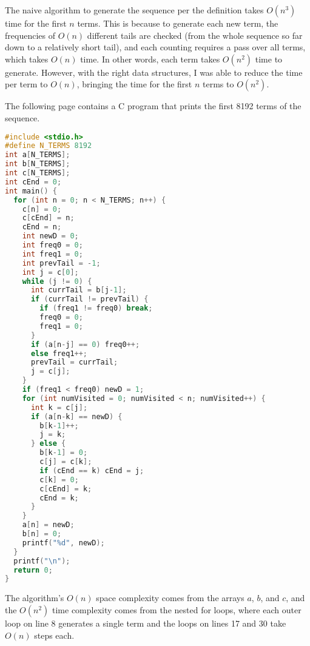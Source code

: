 \documentclass{article}
\begin{document}
The naive algorithm to generate the sequence per the definition
takes $O(n^3)$ time for the first $n$ terms.
This is because to generate each new term,
the frequencies of $O(n)$ different tails are checked
(from the whole sequence so far down to a relatively short tail),
and each counting requires a pass over all terms,
which takes $O(n)$ time.
In other words, each term takes $O(n^2)$ time to generate.
However, with the right data structures,
I was able to reduce the time per term to $O(n)$,
bringing the time for the first $n$ terms to $O(n^2)$.

The following page contains a C program
that prints the first 8192 terms of the sequence.

\newpage

\begin{lstlisting}[language=c]
#include <stdio.h>
#define N_TERMS 8192
int a[N_TERMS];
int b[N_TERMS];
int c[N_TERMS];
int cEnd = 0;
int main() {
  for (int n = 0; n < N_TERMS; n++) {
    c[n] = 0;
    c[cEnd] = n;
    cEnd = n;
    int newD = 0;
    int freq0 = 0;
    int freq1 = 0;
    int prevTail = -1;
    int j = c[0];
    while (j != 0) { 
      int currTail = b[j-1];
      if (currTail != prevTail) {
        if (freq1 != freq0) break;
        freq0 = 0;
        freq1 = 0;
      }
      if (a[n-j] == 0) freq0++;
      else freq1++;
      prevTail = currTail;
      j = c[j];
    }
    if (freq1 < freq0) newD = 1;
    for (int numVisited = 0; numVisited < n; numVisited++) {
      int k = c[j];
      if (a[n-k] == newD) {
        b[k-1]++;
        j = k;
      } else {
        b[k-1] = 0;
        c[j] = c[k];
        if (cEnd == k) cEnd = j;
        c[k] = 0;
        c[cEnd] = k;
        cEnd = k;
      }
    }
    a[n] = newD;
    b[n] = 0;
    printf("%d", newD);
  }
  printf("\n");
  return 0;
}
\end{lstlisting}

\newpage

The algorithm's $O(n)$ space complexity
comes from the arrays $a$, $b$, and $c$,
and the $O(n^2)$ time complexity
comes from the nested for loops,
where each outer loop on line 8 generates a single term
and the loops on lines 17 and 30 take $O(n)$ steps each.
\end{document}
